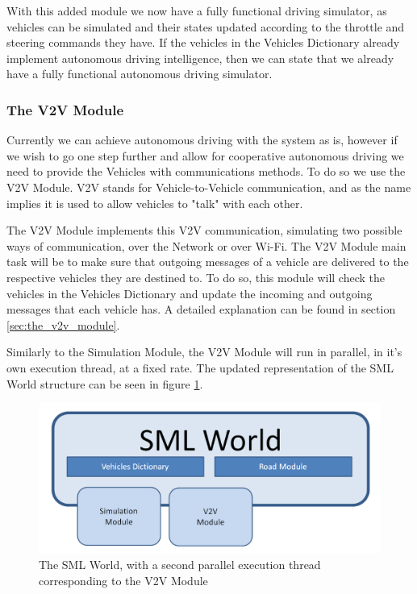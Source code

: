 With this added module we now have a fully functional driving simulator, as vehicles can be simulated and their states updated according to the throttle and steering commands they have. If the vehicles in the Vehicles Dictionary already implement autonomous driving intelligence, then we can state that we already have a fully functional autonomous driving simulator.

\subsubsection{The V2V Module}

Currently we can achieve autonomous driving with the system as is, however if we wish to go one step further and allow for cooperative autonomous driving we need to provide the Vehicles with communications methods. To do so we use the V2V Module. V2V stands for Vehicle-to-Vehicle communication, and as the name implies it is used to allow vehicles to "talk" with each other.

The V2V Module implements this V2V communication, simulating two possible ways of communication, over the Network or over Wi-Fi. The V2V Module main task will be to make sure that outgoing messages of a vehicle are delivered to the respective vehicles they are destined to. To do so, this module will check the vehicles in the Vehicles Dictionary and update the incoming and outgoing messages that each vehicle has. A detailed explanation can be found in section \ref{sec:the_v2v_module}.

Similarly to the Simulation Module, the V2V Module will run in parallel, in it's own execution thread, at a fixed rate. The updated representation of the SML World structure can be seen in figure \ref{fig:sml_world_structure_4}.

\begin{figure}[h!]
  \centering
    \includegraphics[width=1.0\textwidth]{sml_world_structure_4}
    \caption{The SML World, with a second parallel execution thread corresponding to the V2V Module \label{fig:sml_world_structure_4} }
\end{figure}
